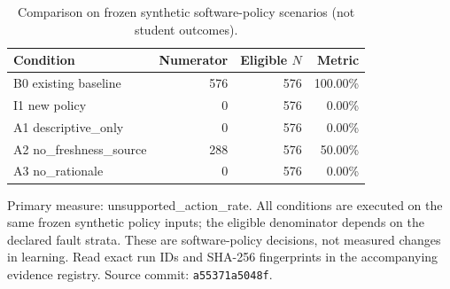 \begin{table}[htbp]
\centering
\small
\caption{Comparison on frozen synthetic software-policy scenarios (not student outcomes).}
\label{tab:ln-09-policy-benchmark}
\begin{tabular}{lrrr}
\toprule
Condition & Numerator & Eligible $N$ & Metric \\
\midrule
B0 existing baseline & 576 & 576 & 100.00\% \\
I1 new policy & 0 & 576 & 0.00\% \\
A1 descriptive\_only & 0 & 576 & 0.00\% \\
A2 no\_freshness\_source & 288 & 576 & 50.00\% \\
A3 no\_rationale & 0 & 576 & 0.00\% \\
\bottomrule
\end{tabular}
\par\smallskip
\begin{minipage}{0.98\linewidth}\footnotesize
Primary measure: unsupported\_action\_rate. All conditions are executed on the same frozen synthetic policy inputs; the eligible denominator depends on the declared fault strata. These are software-policy decisions, not measured changes in learning. Read exact run IDs and SHA-256 fingerprints in the accompanying evidence registry. Source commit: \texttt{a55371a5048f}.
\end{minipage}
\end{table}
